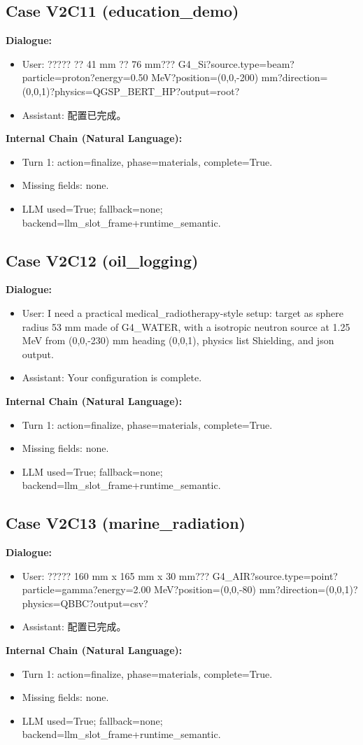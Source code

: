 \documentclass[11pt]{ctexart}
\begin{document}
\subsection{Case V2C11 (education\_demo)}
\textbf{Dialogue:}
\begin{itemize}
\item User: ????? ?? 41 mm ?? 76 mm??? G4\_Si?source.type=beam?particle=proton?energy=0.50 MeV?position=(0,0,-200) mm?direction=(0,0,1)?physics=QGSP\_BERT\_HP?output=root?
\item Assistant: 配置已完成。
\end{itemize}
\textbf{Internal Chain (Natural Language):}
\begin{itemize}
\item Turn 1: action=finalize, phase=materials, complete=True.
\item Missing fields: none.
\item LLM used=True; fallback=none; backend=llm\_slot\_frame+runtime\_semantic.
\end{itemize}
\subsection{Case V2C12 (oil\_logging)}
\textbf{Dialogue:}
\begin{itemize}
\item User: I need a practical medical\_radiotherapy-style setup: target as sphere radius 53 mm made of G4\_WATER, with a isotropic neutron source at 1.25 MeV from (0,0,-230) mm heading (0,0,1), physics list Shielding, and json output.
\item Assistant: Your configuration is complete.
\end{itemize}
\textbf{Internal Chain (Natural Language):}
\begin{itemize}
\item Turn 1: action=finalize, phase=materials, complete=True.
\item Missing fields: none.
\item LLM used=True; fallback=none; backend=llm\_slot\_frame+runtime\_semantic.
\end{itemize}
\subsection{Case V2C13 (marine\_radiation)}
\textbf{Dialogue:}
\begin{itemize}
\item User: ????? 160 mm x 165 mm x 30 mm??? G4\_AIR?source.type=point?particle=gamma?energy=2.00 MeV?position=(0,0,-80) mm?direction=(0,0,1)?physics=QBBC?output=csv?
\item Assistant: 配置已完成。
\end{itemize}
\textbf{Internal Chain (Natural Language):}
\begin{itemize}
\item Turn 1: action=finalize, phase=materials, complete=True.
\item Missing fields: none.
\item LLM used=True; fallback=none; backend=llm\_slot\_frame+runtime\_semantic.
\end{itemize}
\end{document}
